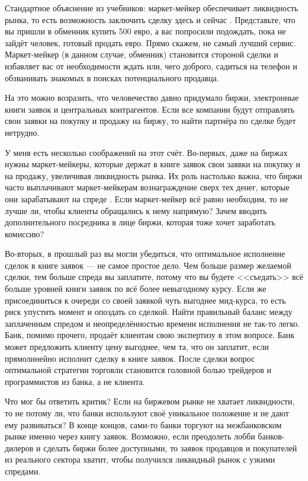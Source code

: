 Стандартное объяснение из учебников: маркет-мейкер обеспечивает ликвидность
рынка, то есть возможность заключить сделку здесь и сейчас \cite[p.
159,223]{hull2015options}. Представьте, что вы пришли в обменник купить
\num{500} евро, а вас попросили подождать, пока не зайдёт человек, готовый
продать евро. Прямо скажем, не самый лучший сервис. Маркет-мейкер (в данном
случае, обменник) становится стороной сделки и избавляет вас от необходимости
ждать или, чего доброго, садиться на телефон и обзванивать знакомых в поисках
потенциального продавца.

На это можно возразить, что человечество давно придумало биржи, электронные
книги заявок и центральных контрагентов. Если все компании будут отправлять свои
заявки на покупку и продажу на биржу, то найти партнёра по сделке будет
нетрудно.

У меня есть несколько соображений на этот счёт. Во-первых, даже на биржах нужны
маркет-мейкеры, которые держат в книге заявок свои заявки на покупку и на
продажу, увеличивая ликвидность рынка. Их роль настолько важна, что биржи часто
выплачивают маркет-мейкерам вознаграждение сверх тех денег, которые они
зарабатывают на спреде \cite{moex2019mm}\cite[ch. 7]{hasbrouck2017securities}.
Если маркет-мейкер всё равно необходим, то не лучше ли, чтобы клиенты обращались
к нему напрямую? Зачем вводить дополнительного посредника в лице биржи, которая
тоже хочет заработать комиссию?

Во-вторых, в прошлый раз вы могли убедиться, что оптимальное исполнение сделок в
книге заявок --- не самое простое дело. Чем больше размер желаемой сделки, тем
больше спреда вы заплатите, потому что вы будете <<съедать>> всё больше уровней
книги заявок по всё более невыгодному курсу. Если же присоединиться к очереди со
своей заявкой чуть выгоднее мид-курса, то есть риск упустить момент и опоздать
со сделкой. Найти правильный баланс между заплаченным спредом и
неопределённостью времени исполнения не так-то легко. Банк, помимо прочего,
продаёт клиентам свою экспертизу в этом вопросе. Банк может предложить клиенту
цену выгоднее, чем та, что он заплатит, если прямолинейно исполнит сделку в
книге заявок. После сделки вопрос оптимальной стратегии торговли становится
головной болью трейдеров и программистов из банка, а не клиента.

Что мог бы ответить критик? Если на биржевом рынке не хватает ликвидности, то не
потому ли, что банки используют своё уникальное положение и не дают ему
развиваться? В конце концов, сами-то банки торгуют на межбанковском рынке именно
через книгу заявок. Возможно, если преодолеть лобби банков-дилеров и сделать
биржи более доступными, то заявок продавцов и покупателей из реального сектора
хватит, чтобы получился ликвидный рынок с узкими спредами.

